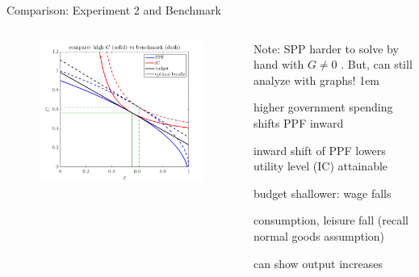\documentclass[11pt,aspectratio=43]{beamer}
\newcommand{\jump}[2]{\hyperlink{#1}{\beamerbutton{#2}}}
\let\olditemize=\itemize
\let\endolditemize=\enditemize
\renewenvironment{itemize}{\olditemize \itemsep1em}{\endolditemize}
\theoremstyle{definition}
\begin{document}
\begin{frame}{Comparison: Experiment 2 and Benchmark}
\label{slide:Comparison__Experiment_2_and_Benchmark}
    \begin{columns}
        \begin{column}{0.5\textwidth}
            \begin{figure}
                \includegraphics[width=\textwidth]{./figures/Exp2BenchmarkCompare.png}
            \end{figure}
        \end{column}
        \begin{column}{0.5\textwidth}
            Note: SPP harder to solve by hand with $ G \neq 0$ \jump{slide:How_to_solve___G__neq_0__}{details}.
            But, can still analyze with graphs!
            \begin{itemize}
                \item higher government spending shifts PPF \alert{inward}
                \item inward shift of PPF lowers utility level (IC) attainable
                \item budget shallower: wage falls
                \item consumption, leisure fall (recall normal goods assumption)
                \item can show output increases
            \end{itemize}
        \end{column}
    \end{columns}
\end{frame}
\end{document}
